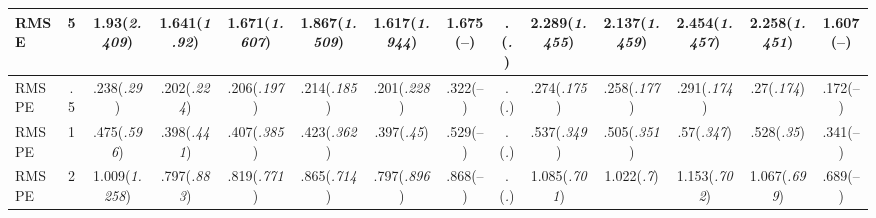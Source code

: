 \documentclass{article}
\begin{document}
\begin{table}[tbp]
{\begin{tabularx}{\textwidth}{lCCCCCCCCCCCCC}
RMSE&5&1.93\newline (\emph{2.409})&1.641\newline (\emph{1.92})&1.671\newline (\emph{1.607})&1.867\newline (\emph{1.509})&1.617\newline (\emph{1.944})&1.675\newline (--)&.\newline (\emph{.})&2.289\newline (\emph{1.455})&2.137\newline (\emph{1.459})&2.454\newline (\emph{1.457})&2.258\newline (\emph{1.451})&1.607\newline (--) \tabularnewline
\midrule RMSPE&.5&.238\newline (\emph{.29})&.202\newline (\emph{.224})&.206\newline (\emph{.197})&.214\newline (\emph{.185})&.201\newline (\emph{.228})&.322\newline (--)&.\newline (\emph{.})&.274\newline (\emph{.175})&.258\newline (\emph{.177})&.291\newline (\emph{.174})&.27\newline (\emph{.174})&.172\newline (--) \tabularnewline
RMSPE&1&.475\newline (\emph{.596})&.398\newline (\emph{.441})&.407\newline (\emph{.385})&.423\newline (\emph{.362})&.397\newline (\emph{.45})&.529\newline (--)&.\newline (\emph{.})&.537\newline (\emph{.349})&.505\newline (\emph{.351})&.57\newline (\emph{.347})&.528\newline (\emph{.35})&.341\newline (--) \tabularnewline
RMSPE&2&1.009\newline (\emph{1.258})&.797\newline (\emph{.883})&.819\newline (\emph{.771})&.865\newline (\emph{.714})&.797\newline (\emph{.896})&.868\newline (--)&.\newline (\emph{.})&1.085\newline (\emph{.701})&1.022\newline (\emph{.7})&1.153\newline (\emph{.702})&1.067\newline (\emph{.699})&.689\newline (--) \tabularnewline

\end{tabularx}}
\end{table}
\end{document}
